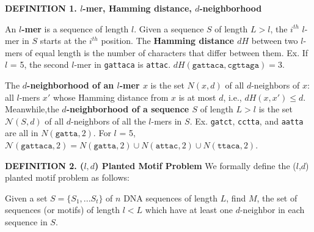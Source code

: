 \documentclass[oneside,12pt]{DISCSthesis}
\begin{document}
		\noindent\textbf{\boldmath DEFINITION 1. $l$-mer, Hamming distance, $d$-neighborhood}

		\noindent An \textbf{\boldmath $l$-mer} is a sequence of length $l$. Given a sequence $S$ of length $L > l$, the $i^{th}$ $l$-mer in $S$ starts at the $i^{th}$ position. The \textbf{\boldmath Hamming distance $dH$} between two $l$-mers of equal length is the number of characters that differ between them.
		\newline\hspace*{35pt} Ex. If $l$ = 5, the second $l$-mer in \texttt{gattaca} is \texttt{attac}.
		\newline\hspace*{55pt} $dH(\texttt{gattaca}, \texttt{cgttaga}) = 3$.

		\noindent The \textbf{\boldmath $d$-neighborhood of an $l$-mer $x$} is the set {\boldmath $N(x, d)$} of all $d$-neighbors of $x$: all $l$-mers $x'$ whose Hamming distance from $x$ is at most $d$, i.e., {\boldmath $dH (x, x') \leq d$}. 
		Meanwhile,the \textbf{\boldmath $d$-neighborhood of a sequence $S$} of length $L > l$ is the set {\boldmath $\mathcal{N}(S, d)$} of all $d$-neighbors of all the $l$-mers in $S$.
		\newline\hspace*{35pt} Ex. \texttt{gatct}, \texttt{cctta}, and \texttt{aatta} are all in $N(\texttt{gatta}, 2)$.
		\newline\hspace*{55pt} For $l$ = 5,
			$\mathcal{N}(\texttt{gattaca}, 2) 
					= N(\texttt{gatta}, 2) \cup 
						N(\texttt{attac}, 2) \cup
						N(\texttt{ttaca}, 2)$.\newline
		
		\noindent\textbf{\boldmath DEFINITION 2. ($l,d$) Planted Motif Problem}
		\newline We formally define the ($l$,$d$) planted motif problem as follows:\bigskip

		\noindent\hspace*{35pt} Given a set $S = \{S_{1},...S_{t}\}$ of $n$ DNA sequences of length $L$,
		\newline \hspace*{70pt} find $M$, the set of sequences (or motifs) of length $l < L$
		\newline \hspace*{70pt} which have at least one $d$-neighbor in each sequence in $S$. %
		
\end{document}
